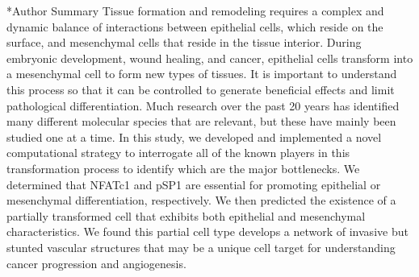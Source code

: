 \documentclass[12pt]{article}
\makeatletter
\renewcommand\section{\@startsection
	{subsection}{2}{0mm}
	{-0.2in}
	{0.05\baselineskip}
	{\normalfont\large\bfseries}}
\makeatother
\begin{document}
\section*{Author Summary}
Tissue formation and remodeling requires a complex and dynamic balance of interactions between epithelial cells, which reside on the surface, and mesenchymal cells that reside in the tissue interior. During embryonic development, wound healing, and cancer, epithelial cells transform into a mesenchymal cell to form new types of tissues.
It is important to understand this process so that it can be controlled to generate beneficial effects and limit pathological differentiation.
Much research over the past 20 years has identified many different molecular species that are relevant, but these have mainly been studied one at a time.
In this study, we developed and implemented a novel computational strategy to interrogate all of the known players in this transformation process to identify which are the major bottlenecks.
We determined that NFATc1 and pSP1 are essential for promoting epithelial or mesenchymal differentiation, respectively.
We then predicted the existence of a partially transformed cell that exhibits both epithelial and mesenchymal characteristics.
We found this partial cell type develops a network of invasive but stunted vascular structures that may be a unique cell target for understanding cancer progression and angiogenesis.
\end{document}
